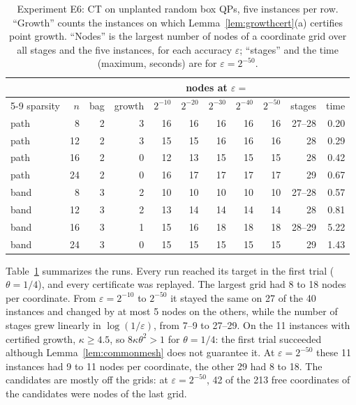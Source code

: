 \begin{table}[t]
\centering\small
\caption{Experiment E6: CT on unplanted random box QPs, five instances per
row. ``Growth'' counts the instances on which
Lemma~\ref{lem:growthcert}(a) certifies point growth. ``Nodes'' is the largest
number of nodes of a coordinate grid over all stages and the five instances,
for each accuracy $\varepsilon$; ``stages'' and the time (maximum, seconds)
are for $\varepsilon=2^{-50}$.}\label{tab:random}
\begin{tabular}{lrrrrrrrrrr}
\toprule
&&&&\multicolumn{5}{c}{nodes at $\varepsilon=$}&&\\
\cmidrule(lr){5-9}
sparsity & $n$ & bag & growth & $2^{-10}$ & $2^{-20}$ & $2^{-30}$ & $2^{-40}$ & $2^{-50}$ & stages & time\\
\midrule
path & 8 & 2 & 3 & 16 & 16 & 16 & 16 & 16 & 27--28 & 0.20\\
path & 12 & 2 & 3 & 15 & 15 & 16 & 16 & 16 & 28 & 0.29\\
path & 16 & 2 & 0 & 12 & 13 & 15 & 15 & 15 & 28 & 0.42\\
path & 24 & 2 & 0 & 16 & 17 & 17 & 17 & 17 & 29 & 0.67\\
band & 8 & 3 & 2 & 10 & 10 & 10 & 10 & 10 & 27--28 & 0.57\\
band & 12 & 3 & 2 & 13 & 14 & 14 & 14 & 14 & 28 & 0.81\\
band & 16 & 3 & 1 & 15 & 16 & 18 & 18 & 18 & 28--29 & 5.22\\
band & 24 & 3 & 0 & 15 & 15 & 15 & 15 & 15 & 29 & 1.43\\
\bottomrule
\end{tabular}
\end{table}

Table~\ref{tab:random} summarizes the runs. Every run reached its target in
the first trial ($\theta=1/4$), and every certificate was replayed. The
largest grid had 8 to 18 nodes per coordinate. From $\varepsilon=2^{-10}$ to
$2^{-50}$ it stayed the same on 27 of the 40 instances and changed by at most
5 nodes on the others, while the number of stages grew linearly in
$\log(1/\varepsilon)$, from 7--9 to 27--29. On the 11 instances with
certified growth, $\kappa\ge4.5$, so $8\kappa\theta^2>1$ for $\theta=1/4$:
the first trial succeeded although Lemma~\ref{lem:commonmesh} does not
guarantee it. At $\varepsilon=2^{-50}$ these 11 instances had 9 to 11 nodes
per coordinate, the other 29 had 8 to 18. The candidates are mostly off the
grids: at $\varepsilon=2^{-50}$, 42 of the 213 free coordinates of
the candidates were nodes of the last grid.

